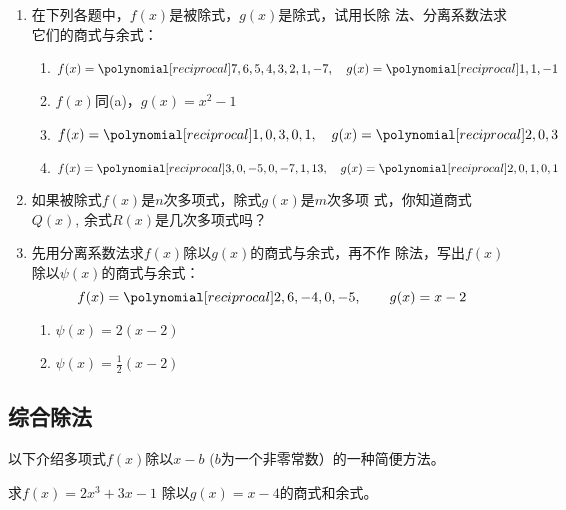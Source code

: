 \begin{ex}
\begin{enumerate}
    \item 在下列各题中，$f(x)$是被除式，$g(x)$是除式，试用长除
    法、分离系数法求它们的商式与余式：
    \begin{enumerate}
        \item $f(x)=\poly{7,6,5,4,3,2,1,-7},\quad g(x)=\poly{1,1,-1}$
        \item $f(x)$同(a)，$g(x)=x^2-1$
        \item $f(x)=\poly{1,0,3,0,1},\quad g(x)=\poly{2,0,3}$
        \item $f(x)=\poly{3,0,-5,0,-7,1,13},\quad g(x)=\poly{2,0,1,0,1}$
    \end{enumerate}

    \item 如果被除式$f(x)$是$n$次多项式，除式$g(x)$是$m$次多项
    式，你知道商式$Q(x)$, 余式$R(x)$是几次多项式吗？
    \item 先用分离系数法求$f(x)$除以$g(x)$的商式与余式，再不作
    除法，写出$f(x)$除以$\psi(x)$的商式与余式：
    \[f(x)=\poly{2,6,-4,0,-5},\qquad g(x)=x-2\]
\begin{enumerate}
    \item $\psi(x)=2(x-2)$
    \item $\psi(x)=\frac{1}{2}(x-2)$
\end{enumerate}

\end{enumerate}

\end{ex}



   \subsection{综合除法}
    以下介绍多项式$f(x)$除以$x-b$ ($b$为一个非零常数）的一种简便方法。
\begin{example}
    求$f(x)=2x^3+3x-1$ 除以$g(x)=x-4$的商式和余式。
\end{example}

